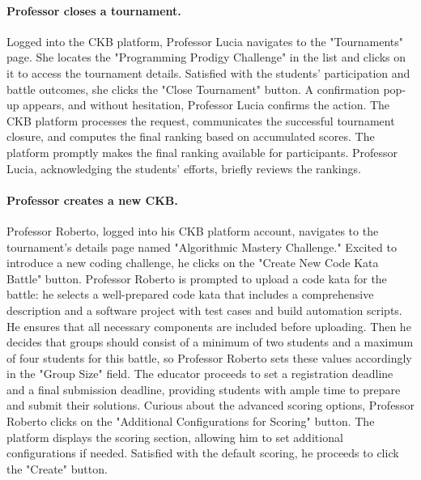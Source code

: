 \paragraph*{Professor closes a tournament.}
Logged into the CKB platform, Professor Lucia navigates to the "Tournaments" page. She locates the "Programming Prodigy Challenge" in the list and clicks
on it to access the tournament details. Satisfied with the students' participation and battle outcomes, she clicks the "Close Tournament" button.
A confirmation pop-up appears, and without hesitation, Professor Lucia confirms the action. The CKB platform processes the request, communicates 
the successful tournament closure, and computes the final ranking based on accumulated scores.
The platform promptly makes the final ranking available for participants. Professor Lucia, acknowledging the students' efforts, briefly reviews the rankings. 

\paragraph*{Professor creates a new CKB.}
Professor Roberto, logged into his CKB platform account, navigates to the tournament's details page named "Algorithmic Mastery Challenge." 
Excited to introduce a new coding challenge, he clicks on the "Create New Code Kata Battle" button. 
Professor Roberto is prompted to upload a code kata for the battle: he selects a well-prepared code kata that includes a comprehensive description and a software project with test cases and build automation scripts. 
He ensures that all necessary components are included before uploading.
Then he decides that groups should consist of a minimum of two students and a maximum of four students for this battle, so Professor Roberto sets these values accordingly in the "Group Size" field.
The educator proceeds to set a registration deadline and a final submission deadline, providing students with ample time to prepare and submit their solutions.
Curious about the advanced scoring options, Professor Roberto clicks on the "Additional Configurations for Scoring" button. 
The platform displays the scoring section, allowing him to set additional configurations if needed. 
Satisfied with the default scoring, he proceeds to click the "Create" button.

